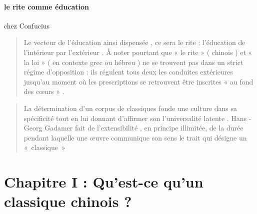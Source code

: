 \paragraph{le rite comme éducation} chez Confucius
 \begin{quote}

Le vecteur de l'éducation ainsi dispensée , ce sera le rite
: l'éducation de l'intérieur par l'extérieur . À noter pourtant que « le
rite » ( chinois ) et « la loi » ( en contexte grec ou hébreu ) ne se
trouvent pas dans un strict régime d'opposition : ils régulent tous deux
les conduites extérieures jusqu'au moment où les prescriptions se
retrouvent être inscrites « au fond des cœurs » .

\end{quote}  \begin{quote}

La détermination d'un corpus de classiques fonde une culture dans sa
spécificité tout en lui donnant d'affirmer son l'universalité latente .
Hans - Georg Gadamer fait de l'extensibilité ,  en principe illimitée, de la durée pendant laquelle une œuvre communique son sens le trait qui désigne un « classique »
\end{quote} 
 
\section{Chapitre I : Qu'est-ce qu'un classique chinois ?}

